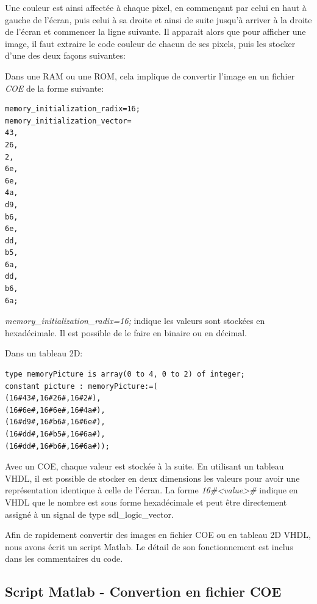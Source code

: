 \documentclass[french]{nakrule}
\begin{document}
Une couleur est ainsi affectée à chaque pixel, en commençant par celui en haut à
gauche de l'écran, puis celui à sa droite et ainsi de suite jusqu'à arriver à la
droite de l'écran et commencer la ligne suivante. Il apparait alors que pour
afficher une image, il faut extraire le code couleur de chacun de ses pixels,
puis les stocker d'une des deux façons suivantes:\vspace{.1in}
\begin{items}
\item Dans une RAM ou une ROM, cela implique de convertir l'image en un fichier
  \emph{COE} de la forme suivante:
  \begin{lstlisting}[frame=single, basicstyle=\scriptsize, backgroundcolor=\color{backcolor}]
memory_initialization_radix=16;
memory_initialization_vector=
43,
26,
2,
6e,
6e,
4a,
d9,
b6,
6e,
dd,
b5,
6a,
dd,
b6,
6a;
\end{lstlisting}
\emph{memory\_initialization\_radix=16;} indique les valeurs sont stockées en
hexadécimale. Il est possible de le faire en binaire ou en décimal.
\vspace{.1in}
\item Dans un tableau 2D:
  \begin{lstlisting}[style=vhdl]
type memoryPicture is array(0 to 4, 0 to 2) of integer;
constant picture : memoryPicture:=(
(16#43#,16#26#,16#2#),
(16#6e#,16#6e#,16#4a#),
(16#d9#,16#b6#,16#6e#),
(16#dd#,16#b5#,16#6a#),
(16#dd#,16#b6#,16#6a#));
  \end{lstlisting}
\end{items}

Avec un COE, chaque valeur est stockée à la suite. En utilisant un tableau VHDL,
il est possible de stocker en deux dimensions les valeurs pour avoir une
représentation identique à celle de l'écran. La forme \emph{16\#<value>\#} indique
en VHDL que le nombre est sous forme hexadécimale et peut être directement
assigné à un signal de type sdl\_logic\_vector.

Afin de rapidement convertir des images en fichier COE ou en tableau 2D VHDL,
nous avons écrit un script Matlab. Le détail de son fonctionnement est inclus
dans les commentaires du code.


\clearpage

\subsection{Script Matlab - Convertion en fichier COE}
\label{subsec:Script1}
\vspace{.1in}

\clearpage
\end{document}
